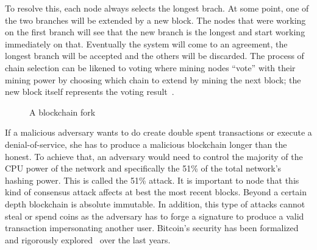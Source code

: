 To resolve this, each node always selects the longest brach. At some point, one of the two branches will be extended by a new block. The nodes that were working on the first branch will see that the new branch is the longest and start working immediately on that. Eventually the system will come to an agreement, the longest branch will be accepted and the others will be discarded. The process of chain selection can be likened to voting where mining nodes ``vote'' with their mining power by choosing which chain to extend by mining the next block; the new block itself represents the voting result~\cite{antonopoulos2014mastering}.

\begin{figure}[!ht]
  \centering
  \caption{A blockchain fork}
  \label{fig:bl:fork}
\end{figure}

If a malicious adversary wants to do create double spent transactions or execute a denial-of-service, she has to produce a malicious blockchain longer than the honest. To achieve that, an adversary would need to control the majority of the CPU power of the network and specifically the 51\% of the total network’s hashing power. This is called the 51\% attack. It is important to node that this kind of consensus attack affects at best the most recent blocks. Beyond a certain depth blockchain is absolute immutable. In addition, this type of attacks cannot steal or spend coins as the adversary has to forge a signature to produce a valid transaction impersonating another user. Bitcoin's security has been formalized and rigorously explored~\cite{10.1007/978-3-662-46803-6_10} over the last years.

